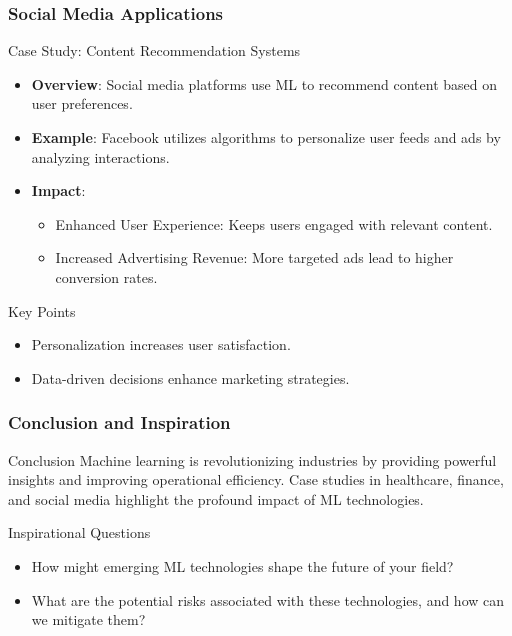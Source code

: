 \documentclass[aspectratio=169]{beamer}
\begin{document}
\begin{frame}[fragile]
    \frametitle{Social Media Applications}
    \begin{block}{Case Study: Content Recommendation Systems}
        \begin{itemize}
            \item \textbf{Overview}: Social media platforms use ML to recommend content based on user preferences.
            \item \textbf{Example}: Facebook utilizes algorithms to personalize user feeds and ads by analyzing interactions.
            \item \textbf{Impact}:
            \begin{itemize}
                \item Enhanced User Experience: Keeps users engaged with relevant content.
                \item Increased Advertising Revenue: More targeted ads lead to higher conversion rates.
            \end{itemize}
        \end{itemize}
    \end{block}
    \begin{block}{Key Points}
        \begin{itemize}
            \item Personalization increases user satisfaction.
            \item Data-driven decisions enhance marketing strategies.
        \end{itemize}
    \end{block}
\end{frame}

\begin{frame}[fragile]
    \frametitle{Conclusion and Inspiration}
    \begin{block}{Conclusion}
        Machine learning is revolutionizing industries by providing powerful insights and improving operational efficiency. Case studies in healthcare, finance, and social media highlight the profound impact of ML technologies.
    \end{block}
    \begin{block}{Inspirational Questions}
        \begin{itemize}
            \item How might emerging ML technologies shape the future of your field?
            \item What are the potential risks associated with these technologies, and how can we mitigate them?
        \end{itemize}
    \end{block}
\end{frame}
\end{document}
